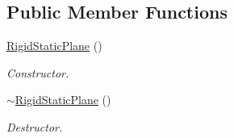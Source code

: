 \subsection*{Public Member Functions}
\begin{DoxyCompactItemize}
\item 
\hypertarget{classContent_1_1Actor_1_1Physics_1_1PhysX_1_1RigidStaticPlane_a0d88f10eb0495d24c222586a3be028ff}{
\hyperlink{classContent_1_1Actor_1_1Physics_1_1PhysX_1_1RigidStaticPlane_a0d88f10eb0495d24c222586a3be028ff}{RigidStaticPlane} ()}
\label{classContent_1_1Actor_1_1Physics_1_1PhysX_1_1RigidStaticPlane_a0d88f10eb0495d24c222586a3be028ff}

\begin{DoxyCompactList}\small\item\em Constructor. \item\end{DoxyCompactList}\item 
\hypertarget{classContent_1_1Actor_1_1Physics_1_1PhysX_1_1RigidStaticPlane_a350d82f0a2963699598de90a57c4cfdc}{
\hyperlink{classContent_1_1Actor_1_1Physics_1_1PhysX_1_1RigidStaticPlane_a350d82f0a2963699598de90a57c4cfdc}{$\sim$RigidStaticPlane} ()}
\label{classContent_1_1Actor_1_1Physics_1_1PhysX_1_1RigidStaticPlane_a350d82f0a2963699598de90a57c4cfdc}

\begin{DoxyCompactList}\small\item\em Destructor. \item\end{DoxyCompactList}\end{DoxyCompactItemize}
